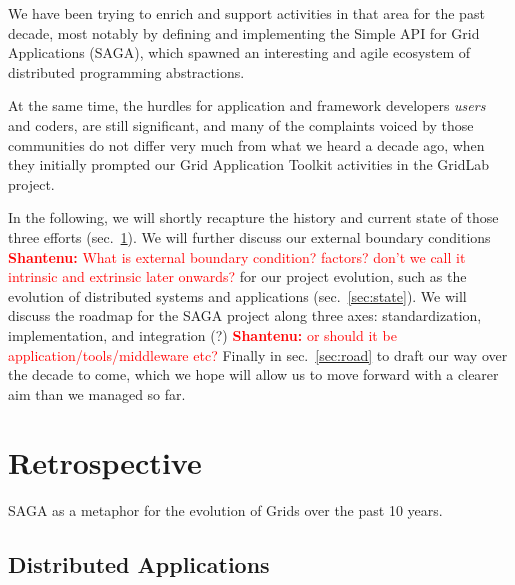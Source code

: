 \documentclass{article}
\newcommand{\I}[1]{\textit{#1}}
\newcommand{\B}[1]{\textbf{#1}}
\newcommand{\jhanote}[1]{{\textcolor{red}{     \B{Shantenu:} #1 }}}
\newcommand{\jhanote}[1]{}
\begin{document}
We have been trying to enrich and support activities in that area for
the past decade, most notably by defining and implementing the Simple
API for Grid Applications (SAGA), which spawned an interesting and
agile ecosystem of distributed programming abstractions.
 
At the same time, the hurdles for application and framework
developers \I{users} and coders, are still significant, and many of
the complaints voiced by those communities do not differ very much
from what we heard a decade ago, when they initially prompted our Grid
Application Toolkit activities in the GridLab project.


 
In the following, we will shortly recapture the history and current
state of those three efforts (sec.~\ref{sec:retro}).  We will further
discuss our external boundary conditions \jhanote{What is external
  boundary condition? factors? don't we call it intrinsic and
  extrinsic later onwards?} for our project evolution, such as the
evolution of distributed systems and applications
(sec.~\ref{sec:state}).  We will discuss the roadmap for the SAGA
project along three axes: standardization, implementation, and
integration (?) \jhanote{ or should it be application/tools/middleware
  etc?}  Finally in sec.~\ref{sec:road} to draft our way over the
decade to come, which we hope will allow us to move forward with a
clearer aim than we managed so far.







\section{Retrospective}
\label{sec:retro}


SAGA as a metaphor for the evolution of Grids over the past 10 years.

 \subsection{Distributed Applications}
\end{document}
